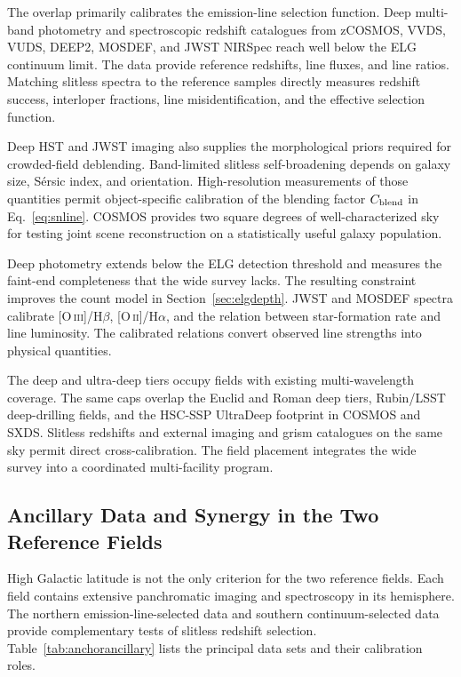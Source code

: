 The overlap primarily calibrates the emission-line selection function. Deep multi-band photometry and spectroscopic redshift catalogues from zCOSMOS, VVDS, VUDS, DEEP2, MOSDEF, and JWST NIRSpec reach well below the ELG continuum limit. The data provide reference redshifts, line fluxes, and line ratios. Matching slitless spectra to the reference samples directly measures redshift success, interloper fractions, line misidentification, and the effective selection function.

Deep HST and JWST imaging also supplies the morphological priors required for crowded-field deblending. Band-limited slitless self-broadening depends on galaxy size, S\'ersic index, and orientation. High-resolution measurements of those quantities permit object-specific calibration of the blending factor $C_{\rm blend}$ in Eq.~\eqref{eq:snline}. COSMOS provides two square degrees of well-characterized sky for testing joint scene reconstruction on a statistically useful galaxy population.

Deep photometry extends below the ELG detection threshold and measures the faint-end completeness that the wide survey lacks. The resulting constraint improves the count model in Section~\ref{sec:elgdepth}. JWST and MOSDEF spectra calibrate [O\,\textsc{iii}]/H$\beta$, [O\,\textsc{ii}]/H$\alpha$, and the relation between star-formation rate and line luminosity. The calibrated relations convert observed line strengths into physical quantities.

The deep and ultra-deep tiers occupy fields with existing multi-wavelength coverage. The same caps overlap the Euclid and Roman deep tiers, Rubin/LSST deep-drilling fields, and the HSC-SSP UltraDeep footprint in COSMOS and SXDS. Slitless redshifts and external imaging and grism catalogues on the same sky permit direct cross-calibration. The field placement integrates the wide survey into a coordinated multi-facility program.

\subsection{Ancillary Data and Synergy in the Two Reference Fields}\label{sec:anchorsynergy}

High Galactic latitude is not the only criterion for the two reference fields. Each field contains extensive panchromatic imaging and spectroscopy in its hemisphere. The northern emission-line-selected data and southern continuum-selected data provide complementary tests of slitless redshift selection. Table~\ref{tab:anchorancillary} lists the principal data sets and their calibration roles.

